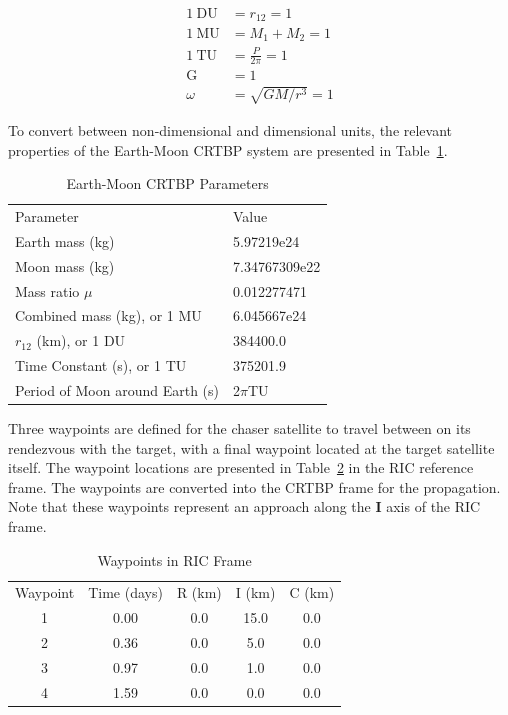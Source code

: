 \documentclass[letterpaper, preprint, paper,11pt]{AAS}	%
\begin{document}
\begin{equation*} \label{eq:nondimen}
	\begin{aligned}
		\mathrm{1 \: DU} &= r_{12} = 1 \\           %
		\mathrm{1 \: MU} &= M_1 + M_2 = 1 \\
		\mathrm{1 \: TU} &= \frac{P}{2\pi} = 1 \\
		\mathrm{G} &= 1 \\
		\omega &= \sqrt{GM/r^3} = 1
	\end{aligned}
\end{equation*}

To convert between non-dimensional and dimensional units, the relevant properties of the Earth-Moon CRTBP system are presented in Table~\ref{tab:Environment_1}.   

\begin{table}[h] 
	\begin{center}
		\begin{tabular}{l l}
			Parameter   & Value \\
			Earth mass (kg) & 5.97219e24 \\
			Moon mass (kg) & 7.34767309e22 \\
			Mass ratio \(\mu\)      & 0.012277471 \\
			Combined mass (kg), or 1 MU & 6.045667e24 \\
			\(r_{12}\) (km), or 1 DU & 384400.0 \\
			Time Constant (s), or 1 TU & 375201.9 \\
			Period of Moon around Earth (s) & 2\(\pi\)TU \\
		\end{tabular}
		\caption{Earth-Moon CRTBP Parameters}
		\label{tab:Environment_1}
	\end{center}
\end{table}

Three waypoints are defined for the chaser satellite to travel between on its rendezvous with the target, with a final waypoint located at the target satellite itself.  The waypoint locations are presented in Table~\ref{tab:Waypoints_1} in the RIC reference frame.  The waypoints are converted into the CRTBP frame for the propagation.  Note that these waypoints represent an approach along the \(\mathbf{I}\) axis of the RIC frame. 

\begin{table}[h] 
	\begin{center}
		\begin{tabular}{ccccc}
			Waypoint   & Time (days) & R (km) & I (km) & C (km) \\
			1 & 0.00 & 0.0 & 15.0 & 0.0 \\
			2 & 0.36 & 0.0 & 5.0 & 0.0 \\
			3 & 0.97 & 0.0 & 1.0 & 0.0 \\
			4 & 1.59 & 0.0 & 0.0 & 0.0 \\
		\end{tabular}
		\caption{Waypoints in RIC Frame}
		\label{tab:Waypoints_1}
	\end{center}
\end{table} 
\end{document}
